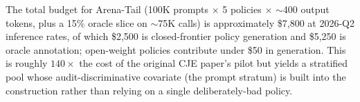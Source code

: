 The total budget for Arena-Tail (100K prompts \(\times\) 5 policies
\(\times\) \(\sim\)400 output tokens, plus a 15\% oracle slice on
\(\sim\)75K calls) is approximately \$7,800 at 2026-Q2 inference rates,
of which \$2,500 is closed-frontier policy generation and \$5,250 is
oracle annotation; open-weight policies contribute under \$50 in
generation. This is roughly \(140\times\) the cost of the original CJE
paper's pilot but yields a stratified pool whose
audit-discriminative covariate (the prompt stratum) is built into the
construction rather than relying on a single deliberately-bad policy.
